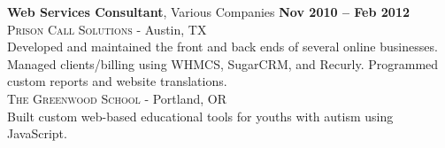 \documentclass[margin,line]{resume}
\begin{document}
\begin{resume}
\textbf{Web Services Consultant}, Various Companies \hfill \textbf{Nov 2010 -- Feb 2012}\vspace{2mm}\\
\textsc{Prison Call Solutions} - Austin, TX\vspace{1mm}\\%
Developed and maintained the front and back ends of several online businesses. Managed clients/billing using WHMCS, SugarCRM, and Recurly. Programmed custom reports and website translations.
\vspace{2mm}\\
\textsc{The Greenwood School} - Portland, OR\vspace{1mm}\\%
Built custom web-based educational tools for youths with autism using JavaScript.

\end{resume}
\end{document}
